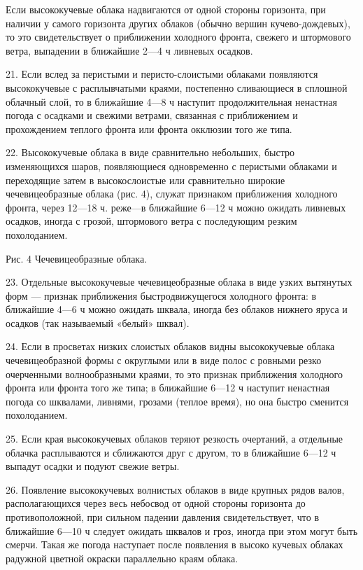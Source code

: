  Если высококучевые облака надвигаются от одной стороны горизонта, при наличии у самого горизонта других облаков (обычно вершин кучево-дождевых), то это свидетельствует о приближении холодного фронта, свежего и штормового ветра, выпадении в ближайшие 2—4 ч ливневых осадков.

21. Если вслед за перистыми и перисто-слоистыми облаками появляются высококучевые с расплывчатыми краями, постепенно сливающиеся в сплошной облачный слой, то в ближайшие 4—8 ч наступит продолжительная ненастная погода с осадками и свежими ветрами, связанная с приближением и прохождением теплого фронта или фронта окклюзии того же типа.

22. Высококучевые облака в виде сравнительно небольших, быстро изменяющихся шаров, появляющиеся одновременно с перистыми облаками и переходящие затем в высокослоистые или сравнительно широкие чечевицеобразные облака (рис. 4), служат признаком приближения холодного фронта, через 12—18 ч. реже—в ближайшие 6—12 ч можно ожидать ливневых осадков, иногда с грозой, штормового ветра с последующим резким похолоданием.


Рис. 4 Чечевицеобразные облака.

23. Отдельные высококучевые чечевицеобразные облака в виде узких вытянутых форм — признак приближения быстродвижущегося холодного фронта: в ближайшие 4—6 ч можно ожидать шквала, иногда без облаков нижнего яруса и осадков (так называемый «белый» шквал).

24. Если в просветах низких слоистых облаков видны высококучевые облака чечевицеобразной формы с округлыми или в виде полос с ровными резко очерченными волнообразными краями, то это признак приближения холодного фронта или фронта того же типа; в ближайшие 6—12 ч наступит ненастная погода со шквалами, ливнями, грозами (теплое время), но она быстро сменится похолоданием.

25. Если края высококучевых облаков теряют резкость очертаний, а отдельные облачка расплываются и сближаются друг с другом, то в ближайшие 6—12 ч выпадут осадки и подуют свежие ветры.

26. Появление высококучевых волнистых облаков в виде крупных рядов валов, располагающихся через весь небосвод от одной стороны горизонта до противоположной, при сильном падении давления свидетельствует, что в ближайшие 6—10 ч следует ожидать шквалов и гроз, иногда при этом могут быть смерчи. Такая же погода наступает после появления в высоко кучевых облаках радужной цветной окраски параллельно краям облака.

